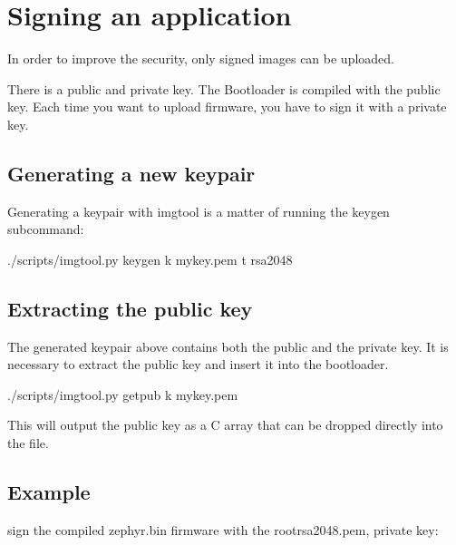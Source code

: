\documentclass[letterpaper,10pt,english]{sphinxmanual}
\begin{document}
\section{Signing an application}
\label{\detokenize{fota/signing:signing-an-application}}\label{\detokenize{fota/signing:signing}}\label{\detokenize{fota/signing::doc}}
In order to improve the security, only signed images can be uploaded.

There is a public and private key.
The Bootloader is compiled with the public key.
Each time you want to upload firmware, you have to sign it with a private key.



\subsection{Generating a new keypair}
\label{\detokenize{fota/signing:generating-a-new-keypair}}
Generating a keypair with imgtool is a matter of running the keygen
subcommand:

\begin{sphinxVerbatim}[commandchars=\\\{\}]
 ./scripts/imgtool.py keygen \PYGZhy{}k mykey.pem \PYGZhy{}t rsa\PYGZhy{}2048
\end{sphinxVerbatim}


\subsection{Extracting the public key}
\label{\detokenize{fota/signing:extracting-the-public-key}}
The generated keypair above contains both the public and the private
key.  It is necessary to extract the public key and insert it into the
bootloader.

\begin{sphinxVerbatim}[commandchars=\\\{\}]
 ./scripts/imgtool.py getpub \PYGZhy{}k mykey.pem
\end{sphinxVerbatim}

This will output the public key as a C array that can be dropped
directly into the  file.


\subsection{Example}
\label{\detokenize{fota/signing:example}}
sign the compiled zephyr.bin firmware with the root\sphinxhyphen{}rsa\sphinxhyphen{}2048.pem, private key:
\end{document}
